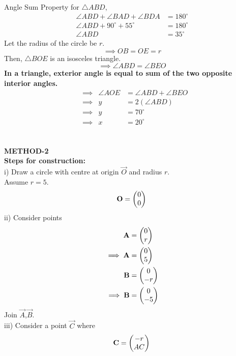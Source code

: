 \documentclass[journal,12pt,twocolumn]{IEEEtran}
\begin{document}
               
Angle Sum Property for $\triangle ABD$,    
\begin{align}
               \angle ABD+\angle BAD+\angle BDA&=180^\circ\\
               \angle ABD+90^\circ+55^\circ&=180^\circ\\
               \angle ABD&=35^\circ
 \end{align}  
 Let the radius of the circle be $r$.\\

 \begin {equation} 
\implies OB=OE=r
\end{equation} 
Then, $\triangle BOE$ is an isosceles triangle.\\
 \begin{equation} 
 \implies \angle ABD=\angle BEO
 \end{equation}  
\textbf{In a triangle, exterior angle is equal to sum of the two opposite interior angles.}\\
\begin{align}
&\implies &\angle AOE&=\angle ABD+\angle BEO\\
&\implies &y&=2(\angle ABD)\\
&\implies &y&=70^\circ\\
&\implies &x&=20^\circ
\end{align}  
\\\\
\textbf{METHOD-2}\\
\textbf{Steps for construction:}\\
i) Draw a circle with centre at origin $\vec{O}$ and radius $r$.\\
      Assume $r=5$.
\begin{equation}
\mathbf{O}= \begin{pmatrix}0\\0\end{pmatrix}\\
\end{equation}
ii) Consider points 
\begin{align}
\mathbf A&=\begin{pmatrix}0\\r\end{pmatrix}\\
\implies \mathbf A &= \begin{pmatrix}0\\5\end{pmatrix}\\
\mathbf B&=\begin{pmatrix}0\\-r\end{pmatrix}\\
\implies \mathbf B &= \begin{pmatrix}0\\-5\end{pmatrix}
\end{align}
Join $\vec A$,$\vec B$.\\
iii) Consider a point $\vec C$ where
\begin{equation}
\mathbf C=\begin{pmatrix}-r\\AC\end{pmatrix}\\
\end{equation}
\end{document}
